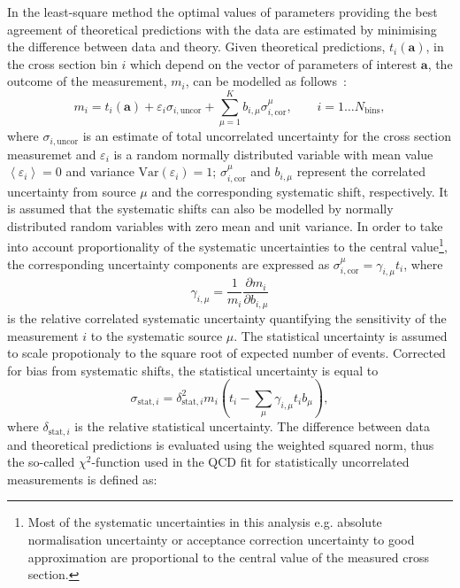 In the least-square method the optimal values of parameters providing the best agreement of theoretical predictions with the data are estimated by minimising the difference between data and theory. Given theoretical predictions, $t_i\left( \mathbf{a} \right)$, in the cross section bin $i$ which depend on the vector of parameters of interest $\mathbf{a}$, the outcome of the measurement, $m_i$, can be modelled as follows~\cite{Stump:2001gu,Botje:2001fx}:
\begin{equation}
 m_i = t_i\left( \mathbf{a} \right) + \varepsilon_{i} \sigma_{i,\text{uncor}} + \sum_{\mu=1}^{K}{b_{i,\mu}\sigma_{i,\text{cor}}^\mu}, \qquad i=1\ldots N_\text{bins},
\end{equation}
where $\sigma_{i,\text{uncor}}$ is an estimate of total uncorrelated uncertainty for the cross section measuremet and $\varepsilon_{i}$ is a random normally distributed variable with mean value $\left\langle \varepsilon_{i}\right\rangle = 0$ and variance $\text{Var}\left( \varepsilon_{i}\right) = 1$; $\sigma_{i,\text{cor}}^\mu$ and $b_{i,\mu}$ represent the correlated uncertainty from source $\mu$ and the corresponding systematic shift, respectively. It is assumed that the systematic shifts can also be modelled by normally distributed random variables with zero mean and unit variance. In order to take into account proportionality of the systematic uncertainties to the central value\footnote{Most of the systematic uncertainties in this analysis e.g. absolute normalisation uncertainty or acceptance correction uncertainty to good approximation are proportional to the central value of the measured cross section.}, the corresponding uncertainty components are expressed as $\sigma_{i,\text{cor}}^\mu = \gamma_{i,\mu}t_i$, where 
\begin{equation}
\gamma_{i,\mu}=\frac{1}{{m_i}} \frac{\partial m_i}{\partial b_{i,\mu}}
\end{equation}
is the relative correlated systematic uncertainty quantifying the sensitivity of the measurement $i$ to the systematic source $\mu$. The statistical uncertainty is assumed to scale propotionaly to the square root of expected number of events. Corrected for bias from systematic shifts, the statistical uncertainty is equal to
\begin{equation}
 \sigma_{\text{stat},i} = \delta_{\text{stat},i}^2m_i\left( t_i - \sum_\mu\gamma_{i,\mu}t_ib_\mu \right),
\end{equation}
where $\delta_{\text{stat},i}$ is the relative statistical uncertainty. The difference between data and theoretical predictions is evaluated using the weighted squared norm, thus the so-called $\chi^2$-function used in the QCD fit  for statistically uncorrelated measurements is defined as:
